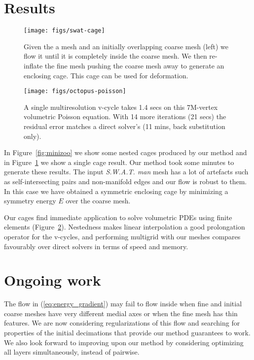 \documentclass{cgyrf15}
\begin{document}
\section{Results}

\begin{figure}[t]
  \texttt{[image: figs/swat-cage]}
  \caption{Given the a mesh and an initially overlapping coarse mesh (left) we
  flow it until it is completely inside the coarse mesh. We then re-inflate the
  fine mesh pushing the coarse mesh away to generate an enclosing cage. This
  cage can be used for deformation.}
  \label{fig:swat}
\end{figure}

\begin{figure}[t]
  \texttt{[image: figs/octopus-poisson]}
  \caption{A single multiresolution v-cycle takes 1.4 secs on this 7M-vertex
  volumetric Poisson equation. With 14 more iterations (21 secs) the residual
  error matches a direct solver's (11 mins, back substitution only).}
  \label{fig:octopus}
\end{figure}

In Figure~\ref{fig:minizoo} we show some nested cages produced by our method
and in Figure~\ref{fig:swat} we show a single cage result. Our method took some
minutes to generate these results. The input \emph{S.W.A.T. man} mesh has a lot
of artefacts such as self-intersecting pairs and non-manifold edges and our
flow is robust to them. In this case we have obtained a symmetric enclosing
cage by minimizing a symmetry energy $E$ over the coarse mesh.

Our cages find immediate application to solve volumetric PDEs using finite
elements (Figure~\ref{fig:octopus}). Nestedness makes linear interpolation a
good prolongation operator for the v-cycles, and performing multigrid with our
meshes compares favourably over direct solvers in terms of speed and memory.

\section{Ongoing work}

The flow in (\ref{eq:energy_gradient}) may fail to flow inside when fine and
initial coarse meshes have very different medial axes or when the fine mesh has
thin features. We are now considering regularizations of this flow and
searching for properties of the initial decimations that provide our method
guarantees to work. We also look forward to improving upon our method by
considering optimizing all layers simultaneously, instead of pairwise.



 
\end{document}
